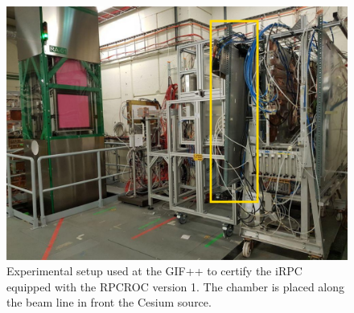 	\begin{figure}[H]
		\centering
		\includegraphics[width = 0.9\linewidth]{fig/chapt6/iRPC-RPCROC-GIFpp.png}
		\caption{\label{fig:RPCROCv1_GIFpp} Experimental setup used at the GIF++ to certify the iRPC equipped with the RPCROC version 1. The chamber is placed along the beam line in front the Cesium source.}
    \end{figure}
	 
